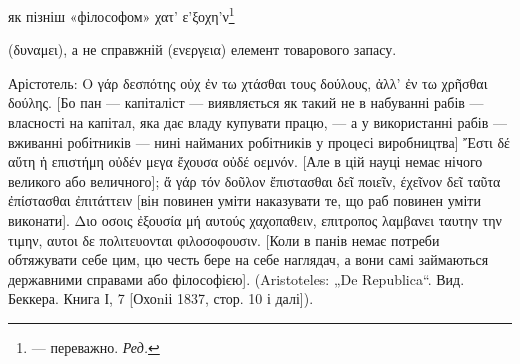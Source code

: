 \documentclass{kapital}
\begin{document}
як пізніш «філософом» \textgreek{χατ’ ε’ξοχη'ν}\footnote*{
— переважно. \emph{Ред.}
}

(\textgreek{δυναμει}), а не справжній (\textgreek{ενεργεια}) елемент товарового запасу.

Арістотель: \textgreek{Ο γάρ δεσπότης οὐχ ἐν τω  χτάσθαι τους δούλους, ἀλλ’ ἐν τω
χρῆσθαι δούλης.} [Бо пан — капіталіст — виявляється як такий не в
набуванні рабів — власності на капітал, яка дає владу купувати
працю, — а у використанні рабів — вживанні робітників — нині
найманих робітників у процесі виробництва] \textgreek{ Ἔστι δέ αὕτη ἡ επιστήμη
οὐδέν μεγα ἔχουσα οὐδέ οεμνόν.} [Але в цій науці немає нічого великого
або величного]; \textgreek{ἄ γάρ τόν δοῦλον ἔπιστασθαι δεῖ ποιεῖν, έχεῖνον δεῖ
ταῦτα ἐπίστασθαι ἐπιτάττειν} [він повинен уміти наказувати те, що раб
повинен уміти виконати]. \textgreek{Διο οσοις ἐξουσία μή αυτούς χαχοπαθειν, επιτροπος
λαμβανει ταυτην την τιμην, αυτοι δε πολιτευονται φιλοσοφουσιν.}
[Коли в панів немає потреби обтяжувати себе цим, цю честь
бере на себе наглядач, а вони самі займаються державними
справами або філософією]. (Aristoteles: „De Republica“. Вид.
Беккера. Книга І, 7 [Охоnіі 1837, стор. 10 і далі]).
\end{document}
